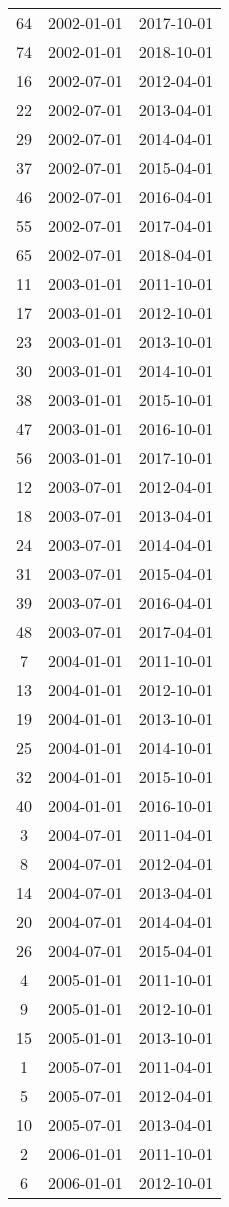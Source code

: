 \begin{tabular}{ccc}
  64 & 2002-01-01 & 2017-10-01 \\ 
  74 & 2002-01-01 & 2018-10-01 \\ 
  16 & 2002-07-01 & 2012-04-01 \\ 
  22 & 2002-07-01 & 2013-04-01 \\ 
  29 & 2002-07-01 & 2014-04-01 \\ 
  37 & 2002-07-01 & 2015-04-01 \\ 
  46 & 2002-07-01 & 2016-04-01 \\ 
  55 & 2002-07-01 & 2017-04-01 \\ 
  65 & 2002-07-01 & 2018-04-01 \\ 
  11 & 2003-01-01 & 2011-10-01 \\ 
  17 & 2003-01-01 & 2012-10-01 \\ 
  23 & 2003-01-01 & 2013-10-01 \\ 
  30 & 2003-01-01 & 2014-10-01 \\ 
  38 & 2003-01-01 & 2015-10-01 \\ 
  47 & 2003-01-01 & 2016-10-01 \\ 
  56 & 2003-01-01 & 2017-10-01 \\ 
  12 & 2003-07-01 & 2012-04-01 \\ 
  18 & 2003-07-01 & 2013-04-01 \\ 
  24 & 2003-07-01 & 2014-04-01 \\ 
  31 & 2003-07-01 & 2015-04-01 \\ 
  39 & 2003-07-01 & 2016-04-01 \\ 
  48 & 2003-07-01 & 2017-04-01 \\ 
  7 & 2004-01-01 & 2011-10-01 \\ 
  13 & 2004-01-01 & 2012-10-01 \\ 
  19 & 2004-01-01 & 2013-10-01 \\ 
  25 & 2004-01-01 & 2014-10-01 \\ 
  32 & 2004-01-01 & 2015-10-01 \\ 
  40 & 2004-01-01 & 2016-10-01 \\ 
  3 & 2004-07-01 & 2011-04-01 \\ 
  8 & 2004-07-01 & 2012-04-01 \\ 
  14 & 2004-07-01 & 2013-04-01 \\ 
  20 & 2004-07-01 & 2014-04-01 \\ 
  26 & 2004-07-01 & 2015-04-01 \\ 
  4 & 2005-01-01 & 2011-10-01 \\ 
  9 & 2005-01-01 & 2012-10-01 \\ 
  15 & 2005-01-01 & 2013-10-01 \\ 
  1 & 2005-07-01 & 2011-04-01 \\ 
  5 & 2005-07-01 & 2012-04-01 \\ 
  10 & 2005-07-01 & 2013-04-01 \\ 
  2 & 2006-01-01 & 2011-10-01 \\ 
  6 & 2006-01-01 & 2012-10-01 \\ 
   \hline
\end{tabular}

